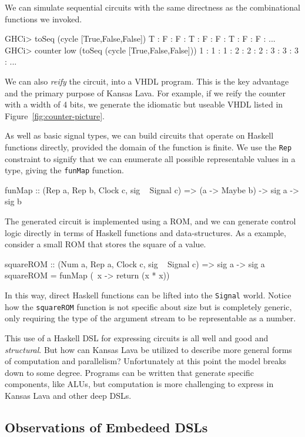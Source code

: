 \documentclass[11pt]{article}
\begin{document}
We can simulate sequential circuits with the
same directness as the combinational functions we invoked.
\begin{Code}
GHCi> toSeq (cycle [True,False,False])
T : F : F : T : F : F : T : F : F : ...
GHCi> counter low (toSeq (cycle [True,False,False]))
1 : 1 : 1 : 2 : 2 : 2 : 3 : 3 : 3 : ...
\end{Code}

We can also {\em reify\/} the circuit, into
a VHDL program. This is the key advantage and the
primary purpose of Kansas Lava. For example,
if we reify the counter with a width of 4 bits, we generate
the idiomatic but useable VHDL
listed in Figure~\ref{fig:counter-picture}.

As well as basic signal types,
we can build circuits that operate on Haskell
functions directly, provided the domain of the
function is finite. We use the \verb|Rep|
constraint to signify that we can enumerate
all possible representable values in a type,
giving the \verb|funMap| function.
\begin{Code}
funMap :: (Rep a, Rep b, Clock c, sig ~ Signal c) => (a -> Maybe b) -> sig a -> sig b
\end{Code}
The generated circuit is implemented using a ROM,
and we can generate control logic
directly in terms of Haskell functions
and data-structures. As a example, consider
a small ROM that stores the square of a
value.
\begin{Code}
squareROM :: (Num a, Rep a, Clock c, sig ~ Signal c) => sig a -> sig a
squareROM = funMap (\ x -> return (x * x))
\end{Code}
In this way, direct Haskell functions
can be lifted into the \verb|Signal| world.
Notice how the \verb|squareROM| function is
not specific about size but is
completely generic, only requiring the
type of the argument stream
to be representable as a number.

This use of a Haskell DSL for expressing circuits
is all well and good and {\em structural\/}.
But how can Kansas Lava be utilized to
describe more general forms of computation and parallelism?
Unfortunately at this point the model breaks down
to some degree. Programs can be written
that generate specific components, like ALUs,
but computation is more challenging to express
in Kansas Lava and other deep DSLs.


\subsection{Observations of Embedeed DSLs}
\end{document}
